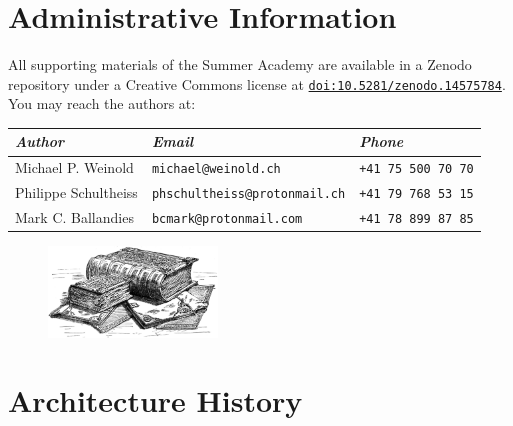 \documentclass[a4paper]{article}
\begin{document}
\section*{\centering Administrative Information}

All supporting materials of the Summer Academy are available in a Zenodo repository under a Creative Commons license at \href{https://doi.org/10.5281/zenodo.14575784}{\texttt{doi:10.5281/zenodo.14575784}}. You may reach the authors at:

\begin{NiceTabularX}{\textwidth}{llX}
\textit{Author} & \textit{Email} & \textit{Phone} \\
\hline
Michael P. Weinold & \texttt{michael@weinold.ch} & \texttt{+41 75 500 70 70} \\
Philippe Schultheiss & \texttt{phschultheiss@protonmail.ch} & \texttt{+41 79 768 53 15} \\
Mark C. Ballandies & \texttt{bcmark@protonmail.com} & \texttt{+41 78 899 87 85}
\end{NiceTabularX}

\begin{figure}[h]
  \centering
  \includegraphics[width=0.4\textwidth]{./figures/books.jpg}
\end{figure}

\tableofcontents

\clearpage
\section{Architecture History}
\end{document}
